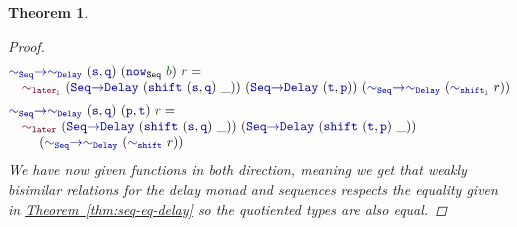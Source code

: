 \documentclass[twoside,11pt,openright]{report}
\theoremstyle{plain} %
\newtheorem{thm}{Theorem}[section]
\theoremstyle{definition}
\theoremstyle{remark}
\newcommand*{\thmref}[1]{\hyperref[thm:#1]{Theorem~\ref*{thm:#1}}} %
\newcommand*{\term}[1]{\textcolor{green!30!black}{#1}} %
\newcommand*{\function}[1]{\textcolor{blue!60!black}{\ensuremath{\mathtt{#1}}}}
\newcommand*{\constructor}[1]{\textcolor{purple!60!black}{\ensuremath{\mathtt{#1}}}}
\begin{document}
\begin{thm}
\begin{proof}
\begin{equation}
\begin{aligned}
        &\function{{\sim}_{Seq}{\rightarrow}{\sim}_{Delay}}~(\function{s},\function{q})~(\function{now}_{\mathtt{Seq}}~\term{b})~\term{r} = \\[-1mm]
        &\quad\constructor{\sim_{later_l}}~(\function{Seq{\rightarrow}Delay}~(\function{shift}~(\function{s},\function{q})~\_))~(\function{Seq{\rightarrow}Delay}~(\function{t},\function{p}))~(\function{{\sim}_{Seq}{\rightarrow}{\sim}_{Delay}}~(\function{\sim_{shift_l}}~r)) \\[1mm]
        &\function{{\sim}_{Seq}{\rightarrow}{\sim}_{Delay}}~(\function{s},\function{q})~(\function{p},\function{t})~\term{r} = \\[-1mm]
        &\quad\constructor{\sim_{later}}~(\function{Seq{\rightarrow}Delay}~(\function{shift}~(\function{s},\function{q})~\_))~(\function{Seq{\rightarrow}Delay}~(\function{shift}~(\function{t},\function{p})~\_))\\[-1mm]
        &\quad\quad~(\function{{\sim}_{Seq}{\rightarrow}{\sim}_{Delay}}~(\function{\sim_{shift}}~r))
    \end{aligned}
  \end{equation}
  We have now given functions in both direction, meaning we get that weakly bisimilar relations for the delay monad and sequences respects the equality given in \thmref{seq-eq-delay} so the quotiented types are also equal.
  \end{proof}
\end{thm}
\end{document}

